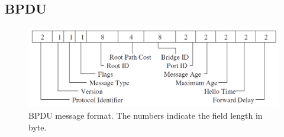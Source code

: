 \documentclass[10pt,a4paper]{article}
\numberwithin{equation}{section}
\numberwithin{figure}{section}
\numberwithin{table}{section}
\begin{document}
\subsection{BPDU}
\begin{figure}[H]
    \centering
    \includegraphics[width=\textwidth]{img/bpdu.png}
    \caption{BPDU message format. The numbers indicate the field length in byte.}
\end{figure}
\end{document}
